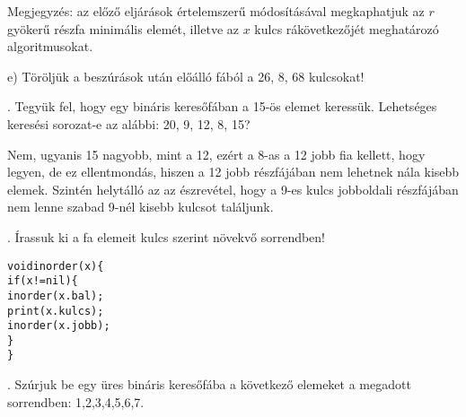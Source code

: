 \documentclass[12pt]{article}
\begin{document}
Megjegyzés: az előző eljárások értelemszerű módosításával megkaphatjuk az $r$ gyökerű részfa minimális elemét, illetve az $x$ kulcs rákövetkezőjét meghatározó algoritmusokat.

\noindent e) Töröljük a beszúrások után előálló fából a 26, 8, 68 kulcsokat!

\begin{figure}[!h]
\centering
\end{figure}

. Tegyük fel, hogy egy bináris keresőfában a 15-ös elemet keressük. Lehetséges keresési sorozat-e az alábbi: 20, 9, 12, 8, 15?

Nem, ugyanis 15 nagyobb, mint a 12, ezért a 8-as a 12 jobb fia kellett, hogy legyen, de ez ellentmondás, hiszen a 12 jobb részfájában nem lehetnek nála kisebb elemek.
Szintén helytálló az az észrevétel, hogy a 9-es kulcs jobboldali részfájában nem lenne szabad 9-nél kisebb kulcsot találjunk.

. Írassuk ki a fa elemeit kulcs szerint növekvő sorrendben!

\begin{alltt}
      void inorder(x) \{
        if(x!=nil) \{
          inorder(x.bal);
          print(x.kulcs);
          inorder(x.jobb);
        \}
      \}
\end{alltt}

. Szúrjuk be egy üres bináris keresőfába a következő elemeket a megadott sorrendben: 1,2,3,4,5,6,7.

\begin{figure}[!h]
\centering
\end{figure}
\end{document}
